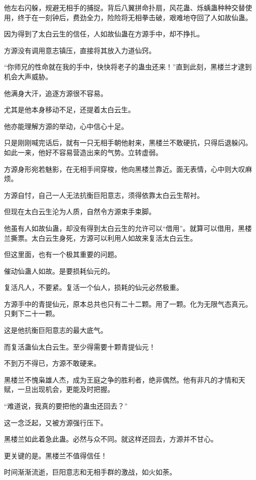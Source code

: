 \begin{this_body}
他左右闪躲，规避无相手的捕捉。背后八翼拼命扑扇，风花蛊、烁蝺蛊种种交替使用，终于在一刻钟后，费劲全力，险险将无相拳击破，艰难地夺回了人如故仙蛊。

因为得到了太白云生的信任，人如故仙蛊在方源手中，却不挣扎。

方源没有调用意志镇压，直接将其放入力道仙窍。

“你师兄的性命就在我的手中，快快将老子的蛊虫还来！”直到此刻，黑楼兰才逮到机会大声威胁。

他满身大汗，追逐方源很不容易。

尤其是他本身移动不足，还提着太白云生。

他亦能理解方源的举动，心中信心十足。

只是刚刚喊完话后，就有一只无相手朝他射来，黑楼兰不敢硬抗，只得后退躲闪。如此一来，他好不容易营造出来的气势。立转虚弱。

方源身形宛若魅影，在无相手间穿梭，他向黑楼兰靠近。面无表情，心中则大叹麻烦。

方源自忖，自己一人无法抗衡巨阳意志，须得依靠太白云生帮衬。

但现在太白云生沦为人质，自然令方源束手束脚。

他虽有人如故仙蛊，却没有得到太白云生的允许可以“借用”。就算可以借用，黑楼兰撕票。太白云生身死，方源可以利用人如故来复活太白云生。

但这里面，也有一个极其重要的问题。

催动仙蛊人如故。是要损耗仙元的。

复活凡人，不要紧。复活一个仙人，损耗的仙元必然极重。

方源手中的青提仙元，原本总共也只有二十二颗。用了一颗。化为无限气态真元。只剩下二十一颗。

这是他抗衡巨阳意志的最大底气。

而复活蛊仙太白云生。至少得需要十颗青提仙元！

不到万不得已，方源不敢硬来。

黑楼兰不愧枭雄人杰，成为王庭之争的胜利者，绝非偶然。他有非凡的才情和天赋，一旦出现机会，更能及时把握。

“难道说，我真的要把他的蛊虫还回去？”

这一念泛起，又被方源强行压下。

黑楼兰如此着急此蛊。必然与众不同。就这样还回去，方源并不甘心。

更关键的是。黑楼兰不值得信任！

时间渐渐流逝，巨阳意志和无相手群的激战，如火如荼。


\end{this_body}
